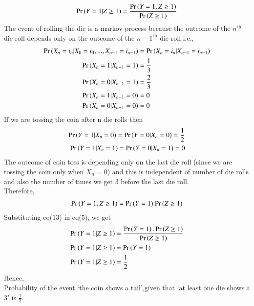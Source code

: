 \documentclass[journal,12pt,twocolumn]{IEEEtran}
\begin{document}
\begin{align}
    \Pr\left(Y=1|Z\geq 1\right)=\frac{\Pr\left(Y=1,Z\geq 1\right)}{\Pr\left(Z \geq 1\right)}
\end{align}
The event of rolling the die is a markov process because the outcome of the $n^{\text{th}}$ die roll depends only on the outcome of the ${n-1}^{\text{th}}$ die roll i.e.,
\begin{align}
       \Pr\left(X_n =i_n|X_0=i_0,...,X_{n-1}=i_{n-1}\right)&= \Pr\left(X_n=i_n|X_{n-1}=i_{n-1}\right)\\
       \Pr\left(X_n=1|X_{n-1}=1\right)&=\frac{1}{3}\\
       \Pr\left(X_n=0|X_{n-1}=1\right)&=\frac{2}{3}\\
       \Pr\left(X_n=1|X_{n-1}=0\right)&=0\\
       \Pr\left(X_n=0|X_{n-1}=0\right)&=0
\end{align}
If we are tossing the coin after n die rolls then
\begin{align}
       \Pr\left(Y=1|X_n =0\right)=\Pr\left(Y=0|X_n=0\right)=\frac{1}{2}\\
        \Pr\left(Y=1|X_n =1\right)=\Pr\left(Y=0|X_n=1\right)=0
\end{align}
The outcome of coin toss is depending only on the last die roll (since we are tossing the coin only when $X_n=0$) and this is independent of number of die rolls and also the number of times we get 3 before the last die roll.
\\Therefore,
\begin{align}
       \Pr\left(Y=1,Z\geq 1\right)={\Pr\left(Y=1\right)}.{\Pr\left(Z\geq 1\right)}
\end{align}
Substituting eq(13) in eq(5), we get
\begin{align}
    \Pr\left(Y=1|Z\geq 1\right)&=\frac{\Pr\left(Y=1\right).\Pr\left(Z\geq 1\right)}{\Pr\left(Z \geq 1\right)}\\
    \Pr\left(Y=1|Z \geq 1\right) &= \Pr\left(Y=1\right)\\
    \Pr\left(Y=1|Z \geq 1\right) &= \frac{1}{2}
\end{align}
Hence,
\\Probability of the event `the coin shows a tail',given that `at least one die shows a 3' is $\frac{1}{2}$.
\end{document}
